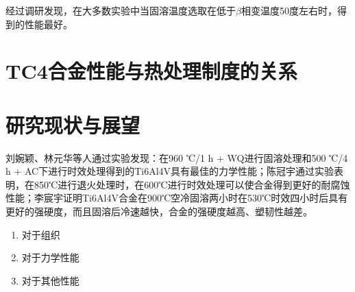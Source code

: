 \documentclass[
class = book,
zihao = -4,
font = noto,
paper = a4paper,
openany
]{easybook}
\newcommand{\ti}{Ti6Al4V}
\begin{document}
经过调研发现，在大多数实验中当固溶温度选取在低于$ \beta $相变温度50度左右时，得到的性能最好。
\section{TC4合金性能与热处理制度的关系}

\section{研究现状与展望}
 刘婉颖、林元华等人通过实验发现：在960 ℃/1 h + WQ进行固溶处理和500 ℃/4 h + AC下进行时效处理得到的\ti 具有最佳的力学性能\cite{960500}；陈冠宇通过实验表明，在850℃进行退火处理时，在600℃进行时效处理可以使合金得到更好的耐腐蚀性能\cite{1200}；李宸宇证明\ti 合金在900℃空冷固溶两小时在530℃时效四小时后具有更好的强硬度，而且固溶后冷速越快，合金的强硬度越高、塑韧性越差\cite{900}。%


	\begin{enumerate}
		\item 对于组织
		\item 对于力学性能
		\item 对于其他性能
	\end{enumerate}


	\backmatter
	\listoffigures
	\listoftables
	\clearpage
	
\end{document}
